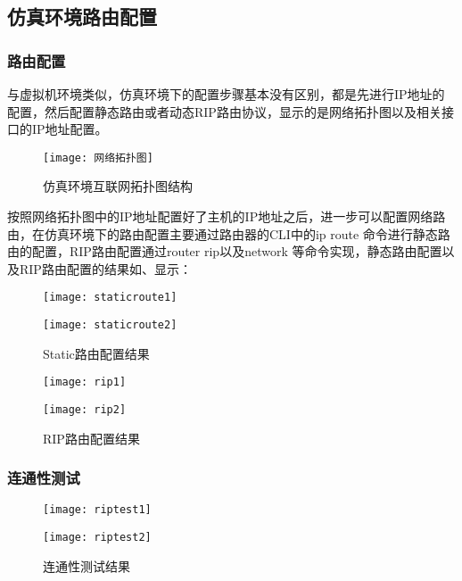 \documentclass[lang=cn,11pt]{elegantpaper}
\begin{document}
\subsection{仿真环境路由配置}
\subsubsection{路由配置}
与虚拟机环境类似，仿真环境下的配置步骤基本没有区别，都是先进行IP地址的配置，然后配置静态路由或者动态RIP路由协议，显示的是网络拓扑图以及相关接口的IP地址配置。
\begin{figure}[htbp]
	\centering
	\texttt{[image: 网络拓扑图]}
	\caption{仿真环境互联网拓扑图结构 \label{fig:11}}
\end{figure}
按照网络拓扑图中的IP地址配置好了主机的IP地址之后，进一步可以配置网络路由，在仿真环境下的路由配置主要通过路由器的CLI中的ip route 命令进行静态路由的配置，RIP路由配置通过router rip以及network 等命令实现，静态路由配置以及RIP路由配置的结果如、显示：
\begin{figure}[htbp]
	\begin{minipage}[t]{0.48\textwidth}
		\centering
		\texttt{[image: staticroute1]}
	\end{minipage}
	\begin{minipage}[t]{0.48\textwidth}
		\centering
		\texttt{[image: staticroute2]}
	\end{minipage}
	\caption{Static路由配置结果 \label{fig:static}}
\end{figure}

\begin{figure}[htbp]
	\begin{minipage}[t]{0.48\textwidth}
		\centering
		\texttt{[image: rip1]}
	\end{minipage}
	\begin{minipage}[t]{0.48\textwidth}
		\centering
		\texttt{[image: rip2]}
	\end{minipage}
\caption{RIP路由配置结果 \label{fig:ripx}}
\end{figure}
\subsubsection{连通性测试}
\begin{figure}[htbp]
	\begin{minipage}[t]{0.48\textwidth}
		\centering
		\texttt{[image: riptest1]}
	\end{minipage}
	\begin{minipage}[t]{0.48\textwidth}
		\centering
		\texttt{[image: riptest2]}
	\end{minipage}
	\caption{连通性测试结果 \label{fig:test}}
\end{figure}
\end{document}
